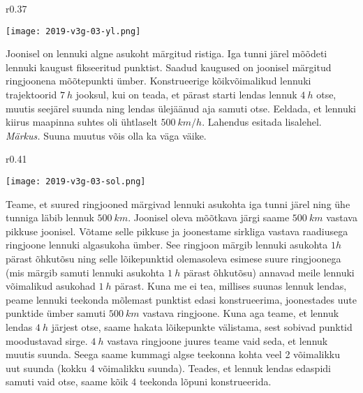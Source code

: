 \setAuthor{}

\begin{wrapfigure}[12]{r}{0.37\textwidth}
  \vspace{-28pt}
  \begin{center}
  \texttt{[image: 2019-v3g-03-yl.png]}
  \end{center}
  \vspace{-20pt}
\end{wrapfigure}


Joonisel on lennuki algne asukoht märgitud ristiga. Iga tunni järel mõõdeti lennuki kaugust fikseeritud punktist. Saadud kaugused on joonisel märgitud ringjoonena mõõtepunkti ümber. Konstrueerige kõikvõimalikud lennuki trajektoorid $\SI{7}{h}$ jooksul, kui on teada, et pärast starti lendas lennuk $\SI{4}{h}$ otse, muutis seejärel suunda ning lendas ülejäänud aja samuti otse. Eeldada, et lennuki kiirus maapinna suhtes oli ühtlaselt $\SI{500}{km/h}$. Lahendus esitada lisalehel.
\textit{Märkus.} Suuna muutus võis olla ka väga väike. 


\hint

\solu
\begin{wrapfigure}{r}{0.41\textwidth}
  \vspace{-15pt}
  \begin{center}
\texttt{[image: 2019-v3g-03-sol.png]}
  \end{center}
  \vspace{-20pt}
\end{wrapfigure}

Teame, et suured ringjooned märgivad lennuki asukohta iga tunni järel ning ühe tunniga läbib lennuk $\SI{500}{km}$. Joonisel oleva mõõtkava järgi saame $\SI{500}{km}$ vastava pikkuse joonisel. Võtame selle pikkuse ja joonestame sirkliga vastava raadiusega ringjoone lennuki algasukoha ümber. See ringjoon märgib lennuki asukohta $1h$ pärast õhkutõsu ning selle lõikepunktid olemasoleva esimese suure ringjoonega (mis märgib samuti lennuki asukohta $\SI{1}{h}$ pärast õhkutõsu) annavad meile lennuki võimalikud asukohad $\SI{1}{h}$ pärast. Kuna me ei tea, millises suunas lennuk lendas, peame lennuki teekonda mõlemast punktist edasi konstrueerima, joonestades uute punktide ümber samuti $\SI{500}{km}$ vastava ringjoone. Kuna aga teame, et lennuk lendas $\SI{4}{h}$ järjest otse, saame hakata lõikepunkte välistama, sest sobivad punktid moodustavad sirge. $\SI{4}{h}$ vastava ringjoone juures teame vaid seda, et lennuk muutis suunda. Seega saame kummagi algse teekonna kohta veel 2 võimalikku uut suunda (kokku 4 võimalikku suunda). Teades, et lennuk lendas edaspidi samuti vaid otse, saame kõik 4 teekonda lõpuni konstrueerida.
\probend